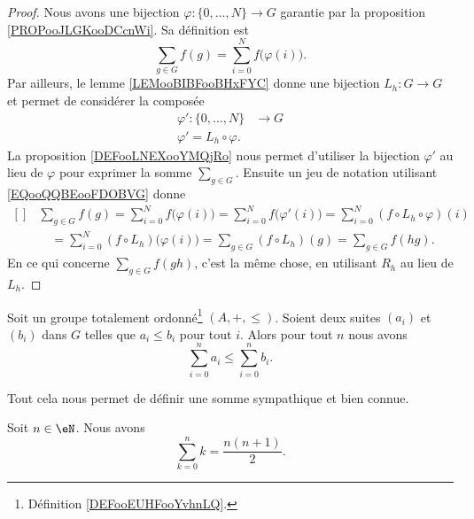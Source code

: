 \begin{proof}
	Nous avons une bijection \( \varphi\colon \{ 0,\ldots,  N \}\to G\) garantie par la proposition \ref{PROPooJLGKooDCcnWi}. Sa définition est
	\begin{equation}
		\sum_{g\in G}f(g)=\sum_{i=0}^Nf\big( \varphi(i) \big).
	\end{equation}
	Par ailleurs, le lemme \ref{LEMooBIBFooBHxFYC} donne une bijection \( L_h\colon G\to G\) et permet de considérer la composée
	\begin{equation}
		\begin{aligned}
			\varphi'\colon \{ 0,\ldots,  N \} & \to G \\
			\varphi'=L_h\circ \varphi.
		\end{aligned}
	\end{equation}
	La proposition \ref{DEFooLNEXooYMQjRo} nous permet d'utiliser la bijection \( \varphi'\) au lieu de \( \varphi\) pour exprimer la somme \( \sum_{g\in G}\). Ensuite un jeu de notation utilisant \eqref{EQooQQBEooFDOBVG} donne
	\begin{equation}
		\begin{aligned}[]
			 & \sum_{g\in G}f(g)=\sum_{i=0}^Nf\big( \varphi(i) \big)=\sum_{i=0}^Nf\big( \varphi'(i) \big)=\sum_{i=0}^N(f\circ L_h\circ \varphi)(i) \\
			 & \quad=\sum_{i=0}^N(f\circ L_h)\big( \varphi(i) \big)=\sum_{g\in G}(f\circ L_h)(g)=\sum_{g\in G}f(hg).
		\end{aligned}
	\end{equation}
	En ce qui concerne \( \sum_{g\in G}f(gh)\), c'est la même chose, en utilisant \( R_h\) au lieu de \( L_h\).
\end{proof}

\begin{lemma}       \label{LEMooKSVWooIFsfwm}
	Soit un groupe totalement ordonné\footnote{Définition \ref{DEFooEUHFooYvhnLQ}.} \( (A,+,\leq)\). Soient deux suites \( (a_i)\) et \( (b_i)\) dans \( G\) telles que \( a_i\leq b_i\) pour tout \( i\). Alors pour tout \( n\) nous avons
	\begin{equation}
		\sum_{i=0}^na_i\leq \sum_{i=0}^nb_i.
	\end{equation}
\end{lemma}

Tout cela nous permet de définir une somme sympathique et bien connue.
\begin{lemma}		\label{LEMooAWEDooErkqZw}
	Soit \( n\in \eN\). Nous avons
	\begin{equation}
		\sum_{k=0}^nk=\frac{ n(n+1) }{ 2 }.
	\end{equation}
\end{lemma}

